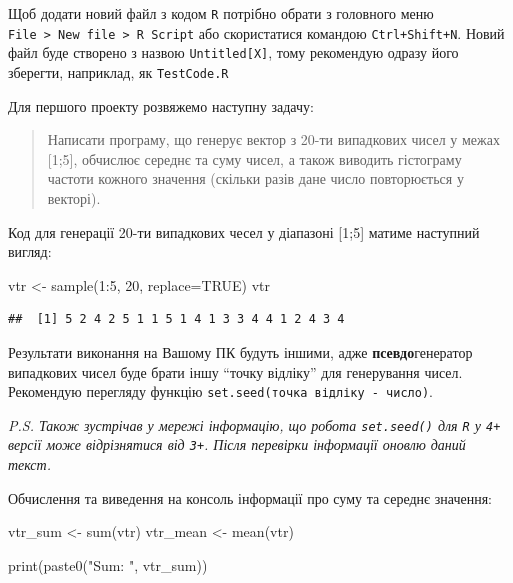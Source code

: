 \documentclass[
]{book}
\newenvironment{Shaded}{\begin{snugshade}}{\end{snugshade}}
\newcommand{\AttributeTok}[1]{\textcolor[rgb]{0.77,0.63,0.00}{#1}}
\newcommand{\ConstantTok}[1]{\textcolor[rgb]{0.00,0.00,0.00}{#1}}
\newcommand{\DecValTok}[1]{\textcolor[rgb]{0.00,0.00,0.81}{#1}}
\newcommand{\FunctionTok}[1]{\textcolor[rgb]{0.00,0.00,0.00}{#1}}
\newcommand{\NormalTok}[1]{#1}
\newcommand{\OtherTok}[1]{\textcolor[rgb]{0.56,0.35,0.01}{#1}}
\newcommand{\SpecialCharTok}[1]{\textcolor[rgb]{0.00,0.00,0.00}{#1}}
\newcommand{\StringTok}[1]{\textcolor[rgb]{0.31,0.60,0.02}{#1}}
\begin{document}
Щоб додати новий файл з кодом \texttt{R} потрібно обрати з головного меню \texttt{File\ \textgreater{}\ New\ file\ \textgreater{}\ R\ Script} або скористатися командою \texttt{Ctrl+Shift+N}. Новий файл буде створено з назвою \texttt{Untitled{[}X{]}}, тому рекомендую одразу його зберегти, наприклад, як \texttt{TestCode.R}

Для першого проекту розвяжемо наступну задачу:

\begin{quote}
Написати програму, що генерує вектор з 20-ти випадкових чисел у межах {[}1;5{]}, обчислює середнє та суму чисел, а також виводить гістограму частоти кожного значення (скільки разів дане число повторюється у векторі).
\end{quote}

Код для генерації 20-ти випадкових чесел у діапазоні {[}1;5{]} матиме наступний вигляд:

\begin{Shaded}
\begin{Highlighting}[]
\NormalTok{vtr }\OtherTok{\textless{}{-}} \FunctionTok{sample}\NormalTok{(}\DecValTok{1}\SpecialCharTok{:}\DecValTok{5}\NormalTok{, }\DecValTok{20}\NormalTok{, }\AttributeTok{replace=}\ConstantTok{TRUE}\NormalTok{)}
\NormalTok{vtr}
\end{Highlighting}
\end{Shaded}

\begin{verbatim}
##  [1] 5 2 4 2 5 1 1 5 1 4 1 3 3 4 4 1 2 4 3 4
\end{verbatim}

Результати виконання на Вашому ПК будуть іншими, адже \textbf{псевдо}генератор випадкових чисел буде брати іншу ``точку відліку'' для генерування чисел. Рекомендую перегляду функцію \texttt{set.seed(точка\ відліку\ -\ число)}.

\emph{P.S. Також зустрічав у мережі інформацію, що робота \texttt{set.seed()} для \texttt{R} у \texttt{4+} версії може відрізнятися від \texttt{3+}. Після перевірки інформації оновлю даний текст.}

Обчислення та виведення на консоль інформації про суму та середнє значення:

\begin{Shaded}
\begin{Highlighting}[]
\NormalTok{vtr\_sum }\OtherTok{\textless{}{-}} \FunctionTok{sum}\NormalTok{(vtr)}
\NormalTok{vtr\_mean }\OtherTok{\textless{}{-}} \FunctionTok{mean}\NormalTok{(vtr)}

\FunctionTok{print}\NormalTok{(}\FunctionTok{paste0}\NormalTok{(}\StringTok{"Sum: "}\NormalTok{, vtr\_sum))}
\end{Highlighting}
\end{Shaded}
\end{document}

